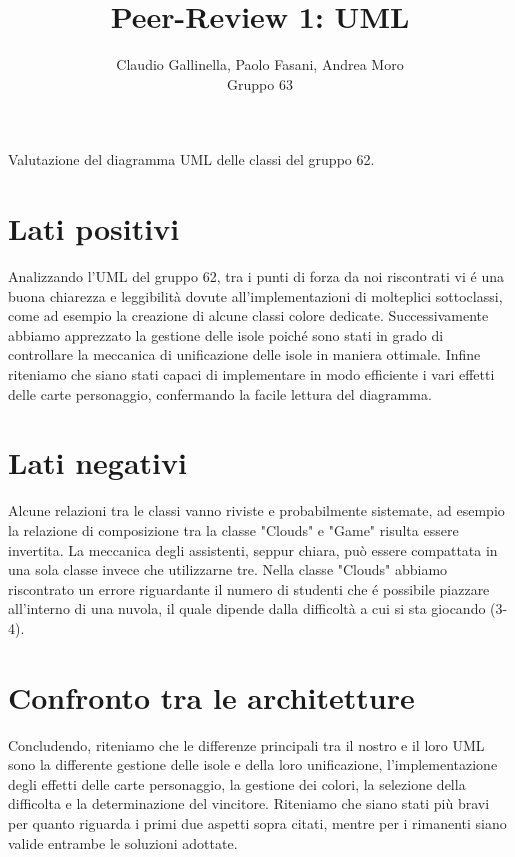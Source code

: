 \documentclass[12pt]{article}
\title{Peer-Review 1: UML}
\author{Claudio Gallinella, Paolo Fasani, Andrea Moro\\Gruppo 63}
\begin{document}
\maketitle

Valutazione del diagramma UML delle classi del gruppo 62.

\section{Lati positivi}

Analizzando l'UML del gruppo 62, tra i punti di forza da noi riscontrati vi é una buona chiarezza e leggibilità dovute all'implementazioni di molteplici sottoclassi, come ad esempio la creazione di alcune classi colore dedicate.
Successivamente abbiamo apprezzato la gestione delle isole poiché sono stati in grado di controllare la meccanica di unificazione delle isole in maniera ottimale.
Infine riteniamo che siano stati capaci di implementare in modo efficiente i vari effetti delle carte personaggio, confermando la facile lettura del diagramma.

\section{Lati negativi}

Alcune relazioni tra le classi vanno riviste e probabilmente sistemate, ad esempio la relazione di composizione tra la classe "Clouds" e "Game" risulta essere invertita.
La meccanica degli assistenti, seppur chiara, può essere compattata in una sola classe invece che utilizzarne tre.
Nella classe "Clouds" abbiamo riscontrato un errore riguardante il numero di studenti che é possibile piazzare all'interno di una nuvola, il quale dipende dalla difficoltà a cui si sta giocando (3-4).

\section{Confronto tra le architetture}

Concludendo, riteniamo che le differenze principali tra il nostro e il loro UML sono la differente gestione delle isole e della loro unificazione, l'implementazione degli effetti delle carte personaggio, la gestione dei colori, la selezione della difficolta e la determinazione del vincitore.
Riteniamo che siano stati più bravi per quanto riguarda i primi due aspetti sopra citati, mentre per i rimanenti siano valide entrambe le soluzioni adottate.
\end{document}
